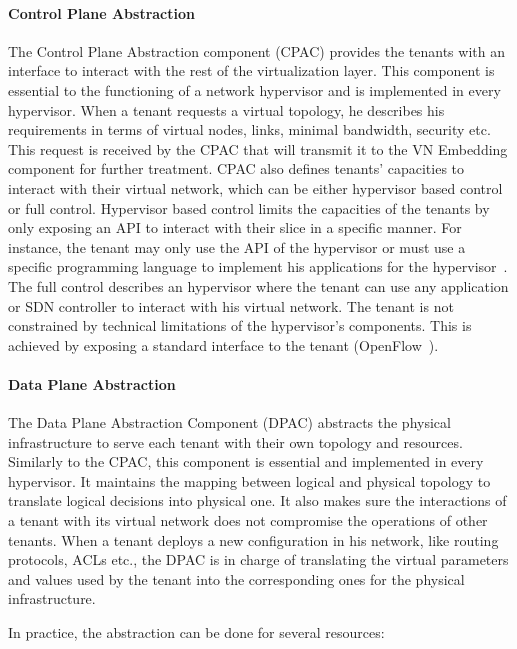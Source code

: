 \paragraph{Control Plane Abstraction}
The Control Plane Abstraction component (CPAC) provides the tenants with an interface to interact with the rest of the virtualization layer.
This component is essential to the functioning of a network hypervisor and is implemented in every hypervisor.
When a tenant requests a virtual topology, he describes his requirements in terms of virtual nodes, links, minimal bandwidth, security etc. This request is received by the CPAC that will transmit it to the VN Embedding component for further treatment.
CPAC also defines tenants' capacities to interact with their virtual network, which can be either hypervisor based control or full control.
Hypervisor based control limits the capacities of the tenants by only exposing an API to interact with their slice in a specific manner. For instance, the tenant may only use the API of the hypervisor or must use a specific programming language to implement his applications for the hypervisor~\cite{FlowN-Drutskoy2012,NetworkHypervisor-Huang2013}. 
The full control describes an hypervisor where the tenant can use any application or SDN controller to interact with his virtual network. The tenant is not constrained by technical limitations of the hypervisor's components.
This is achieved by exposing a standard interface to the tenant (\eg OpenFlow~\cite{Openflow-McKeown2008}).


\paragraph{Data Plane Abstraction}
\label{sec:abstraction_comp}
The Data Plane Abstraction Component (DPAC) abstracts the physical infrastructure to serve each tenant with their own topology and resources.
Similarly to the CPAC, this component is essential and implemented in every hypervisor.
It maintains the mapping between logical and physical topology to translate logical decisions into physical one.
It also makes sure the interactions of a tenant with its virtual network does not compromise the operations of other tenants. When a tenant deploys a new configuration in his network, like routing protocols, ACLs etc., the DPAC is in charge of translating the virtual parameters and values used by the tenant into the corresponding ones for the physical infrastructure.

In practice, the abstraction can be done for several resources:


